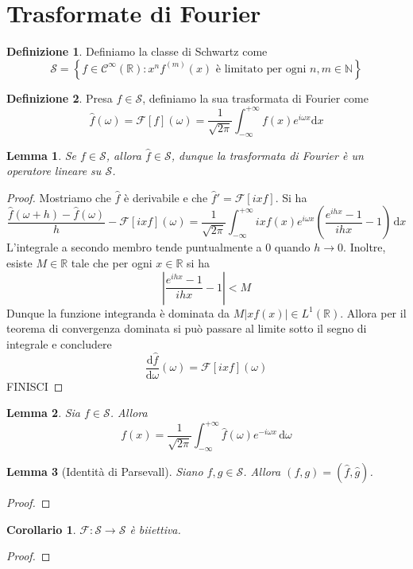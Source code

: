 \documentclass[a4paper,11pt]{book}
\newcommand{\dif}{\mathrm{d}}
\newcommand{\R}{\mathbb{R}}
\newcommand{\fourier}[2]{\frac{1}{\sqrt{2\pi}}\int_{-\infty}^{+\infty}#1\,\dif#2}
\theoremstyle{theorem}
\newtheorem{lemma}{Lemma}[section]
\newtheorem{corollario}{Corollario}[section]
\theoremstyle{definition}
\newtheorem{definizione}{Definizione}[section]
\begin{document}
\section{Trasformate di Fourier}
\begin{definizione}
	Definiamo la classe di Schwartz come 
	\[\mathcal{S}=\left\{f\in\mathcal{C}^{\infty}(\R):x^nf^{(m)}(x)\textrm{ è limitato per ogni }n,m\in\mathbb{N}\right\}\]
\end{definizione}
\begin{definizione}
	Presa $f\in\mathcal{S}$, definiamo la sua trasformata di Fourier come
	\[\hat{f}(\omega)=\mathcal{F}[f](\omega)=\frac{1}{\sqrt{2\pi}}\int_{-\infty}^{+\infty}f(x)e^{i\omega x}\dif x\]
\end{definizione}
\begin{lemma}
	Se $f\in\mathcal{S}$, allora $\hat{f}\in\mathcal{S}$, dunque la trasformata di Fourier è un operatore lineare su $\mathcal{S}$.
\end{lemma}
\begin{proof}
	Mostriamo che $\hat{f}$ è derivabile e che $\hat{f}'=\mathcal{F}[ixf]$. Si ha
	\[\frac{\hat{f}(\omega+h)-\hat{f}(\omega)}{h}-\mathcal{F}[ixf](\omega)=\fourier{ixf(x)e^{i\omega x}\left(\frac{e^{ihx}-1}{ihx}-1\right)}{x}\]
	L'integrale a secondo membro tende puntualmente a 0 quando $h\to 0$. Inoltre, esiste $M\in\R$ tale che per ogni $x\in\R$ si ha
	\[\left|\frac{e^{ihx}-1}{ihx}-1\right|<M\]
	Dunque la funzione integranda è dominata da $M|xf(x)|\in L^1(\R)$. Allora per il teorema di convergenza dominata si può passare al limite sotto il segno di integrale e concludere
	\[\frac{\dif \hat{f}}{\dif\omega}(\omega)=\mathcal{F}[ixf](\omega)\] FINISCI
\end{proof}
\begin{lemma}
	Sia $f\in\mathcal{S}$. Allora
	\[f(x)=\fourier{\hat{f}(\omega)e^{-i\omega x}}{\omega}\]
\end{lemma}
\begin{lemma}[Identità di Parsevall] Siano $f,g\in\mathcal{S}$. Allora $(f,g)=(\hat{f},\hat{g})$.
\end{lemma}
\begin{proof}
	
\end{proof}
\begin{corollario}
	$\mathcal{F}\colon\mathcal{S}\to\mathcal{S}$ è biiettiva.
\end{corollario}
\begin{proof}
	
\end{proof}
\end{document}
